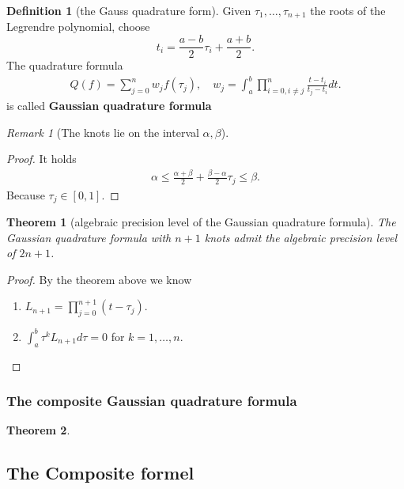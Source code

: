 \documentclass[a4paper,12pt,oneside,fleqn]{book}
\newtheorem{theorem}{Theorem}[section]
\theoremstyle{definition}
\newtheorem{definition}{Definition}[section]
\theoremstyle{remark}
\newtheorem*{remark}{Remark}
\begin{document}
\begin{definition}[the Gauss quadrature form]
Given $\tau_1, \dots, \tau_{n + 1}$ the roots of the Legrendre polynomial, choose 
\begin{equation}
	t_i = \frac{a - b}{2} \tau_i +  \frac{a + b}{2}. 
\end{equation}	
The quadrature formula 
\begin{align*}
	Q(f) = \sum_{j = 0}^n w_j f(\tau_j), 
	\quad
	w_j = \int_a^b \prod_{i = 0, i \neq j}^n \frac{t - t_i}{t_j - t_i}dt. 
\end{align*}
 is called \textbf{Gaussian quadrature formula}
\end{definition}

\begin{remark}[The knots lie on the interval $\alpha, \beta$]
\begin{proof}
It holds
\begin{align*}
	\alpha \le \frac{\alpha + \beta}{2} + \frac{\beta - \alpha }{2}\tau_j \le \beta. 
\end{align*}
Because $\tau_j \in [0, 1]$. 
\end{proof}
\end{remark}

\begin{theorem}[algebraic precision level of the Gaussian quadrature formula]
	The Gaussian quadrature formula with $n + 1$ knots admit the algebraic precision level of $2n + 1$. 
\end{theorem}
\begin{proof}
	By the theorem above we know 
	\begin{enumerate}
		\item $L_{n + 1} = \prod_{j = 0}^{n + 1} (t - \tau_j)$. 
		\item $\int_a^b \tau^k L_{n + 1} d\tau = 0$ for $k = 1, \dots, n$. 
	\end{enumerate}
\end{proof}

\subsubsection{The composite Gaussian quadrature formula}
\begin{theorem}
	
\end{theorem}





\subsection{The Composite formel}
\end{document}
